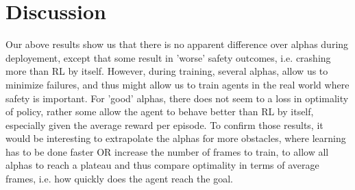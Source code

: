   \section{Discussion}
  Our above results show us that there is no apparent difference over alphas during deployement, except that some result in 'worse' safety outcomes, i.e. crashing more than RL by itself.  
  However, during training, several alphas, allow us to minimize failures, and thus might allow us to train agents in the real world where safety is important. 
  For 'good' alphas, there does not seem to a loss in optimality of policy, rather some allow the agent to behave better than RL by itself, especially given the average reward per episode. 
  To confirm those results, it would be interesting to extrapolate the alphas for more obstacles, where learning has to be done faster OR increase the number of frames to train, to allow all alphas 
  to reach a plateau and thus compare optimality in terms of average frames, i.e. how quickly does the agent reach the goal. 






